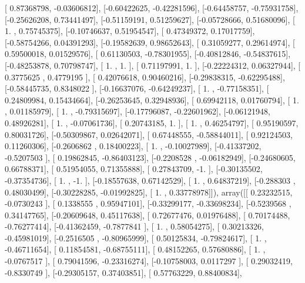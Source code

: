 \documentclass{article}
\begin{document}
       [ 0.87368798, -0.03606812],
       [-0.60422625, -0.42281596],
       [-0.64458757, -0.75931758],
       [-0.25626208,  0.73441497],
       [-0.51159191,  0.51259627],
       [-0.05728666,  0.51680096],
       [ 1.        ,  0.75745375],
       [-0.10746637,  0.51954547],
       [ 0.47349372,  0.17017759],
       [-0.58754266,  0.04391293],
       [-0.19582639,  0.98652643],
       [ 0.31059277,  0.29614974],
       [ 0.59500018,  0.01529576],
       [ 0.61130503, -0.78301955],
       [-0.40812846, -0.54837615],
       [-0.48253878,  0.70798747],
       [ 1.        ,  1.        ],
       [ 0.71197991,  1.        ],
       [-0.22224312,  0.06327944],
       [ 0.3775625 ,  0.4779195 ],
       [ 0.42076618,  0.90460216],
       [-0.29838315, -0.62295488],
       [-0.58445735,  0.8348022 ],
       [-0.16637076, -0.64249237],
       [ 1.        , -0.77158351],
       [ 0.24809984,  0.15434664],
       [-0.26253645,  0.32948936],
       [ 0.69942118,  0.01760794],
       [ 1.        ,  0.01185979],
       [ 1.        , -0.79315697],
       [-0.17796087, -0.22601962],
       [-0.06121948,  0.48926281],
       [ 1.        , -0.07061736],
       [ 0.20743185,  1.        ],
       [ 1.        ,  0.46254797],
       [ 0.95190597,  0.80031726],
       [-0.50309867,  0.02642071],
       [ 0.67448555, -0.58844011],
       [ 0.92124503,  0.11260306],
       [-0.2606862 ,  0.18400223],
       [ 1.        , -0.10027989],
       [-0.41337202, -0.5207503 ],
       [ 0.19862845, -0.86403123],
       [-0.2208528 , -0.06182949],
       [-0.24680605,  0.66788371],
       [ 0.51954055,  0.71355888],
       [ 0.27843709, -1.        ],
       [-0.30135502, -0.37354736],
       [ 1.        , -1.        ],
       [-0.18557638,  0.67142529],
       [ 1.        ,  0.64837219],
       [-0.288303  ,  0.48030499],
       [-0.30228285, -0.01992825],
       [ 1.        ,  0.33778978]]), array([[ 0.23232515, -0.0730243 ],
       [ 0.1338555 ,  0.95947101],
       [-0.33299177, -0.33698234],
       [-0.5239568 ,  0.34147765],
       [-0.20609648,  0.45117638],
       [ 0.72677476,  0.01976488],
       [ 0.70174488, -0.76277414],
       [-0.41362459, -0.7877841 ],
       [ 1.        ,  0.58054275],
       [ 0.30213326, -0.45981019],
       [-0.2516505 , -0.80965999],
       [ 0.50125834, -0.79824617],
       [ 1.        , -0.46711654],
       [ 0.11854581, -0.68755111],
       [ 0.48152265,  0.57680886],
       [ 1.        , -0.0767517 ],
       [ 0.79041596, -0.23316274],
       [-0.10758003,  0.0117297 ],
       [ 0.29032419, -0.8330749 ],
       [-0.29305157,  0.37403851],
       [ 0.57763229,  0.88400834],
\end{document}
